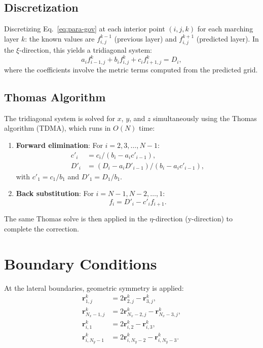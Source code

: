 \documentclass[11pt,a4paper]{report}
\newcommand{\rvec}{\bm{r}}
\begin{document}
\subsection{Discretization}

Discretizing Eq.~\eqref{eq:para-gov} at each interior point $(i, j, k)$ for each marching layer $k$: the known values are $f_{i,j}^{k-1}$ (previous layer) and $f_{i,j}^{k+1}$ (predicted layer). In the $\xi$-direction, this yields a tridiagonal system:
\begin{equation}
    a_i f_{i-1,j}^{k} + b_i f_{i,j}^{k} + c_i f_{i+1,j}^{k} = D_i,
\end{equation}
where the coefficients involve the metric terms computed from the predicted grid.

\subsection{Thomas Algorithm}

The tridiagonal system is solved for $x$, $y$, and $z$ simultaneously using the Thomas algorithm (TDMA), which runs in $O(N)$ time:

\begin{enumerate}
    \item \textbf{Forward elimination}: For $i = 2, 3, \ldots, N-1$:
    \begin{equation}
    \begin{aligned}
        c'_i &= c_i / (b_i - a_i c'_{i-1}), \\
        D'_i &= (D_i - a_i D'_{i-1}) / (b_i - a_i c'_{i-1}),
    \end{aligned}
    \end{equation}
    with $c'_1 = c_1/b_1$ and $D'_1 = D_1/b_1$.

    \item \textbf{Back substitution}: For $i = N-1, N-2, \ldots, 1$:
    \begin{equation}
        f_i = D'_i - c'_i f_{i+1}.
    \end{equation}
\end{enumerate}

The same Thomas solve is then applied in the $\eta$-direction (y-direction) to complete the correction.

\section{Boundary Conditions}

At the lateral boundaries, geometric symmetry is applied:
\begin{equation}
\begin{aligned}
    \rvec_{1,j}^{k} &= 2\rvec_{2,j}^{k} - \rvec_{3,j}^{k}, \\
    \rvec_{N_x-1,j}^{k} &= 2\rvec_{N_x-2,j}^{k} - \rvec_{N_x-3,j}^{k}, \\
    \rvec_{i,1}^{k} &= 2\rvec_{i,2}^{k} - \rvec_{i,3}^{k}, \\
    \rvec_{i,N_y-1}^{k} &= 2\rvec_{i,N_y-2}^{k} - \rvec_{i,N_y-3}^{k}.
\end{aligned}
\end{equation}
\end{document}

